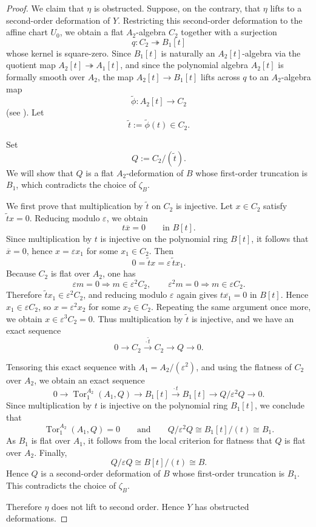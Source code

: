 \documentclass[11pt,twoside]{amsart}
\theoremstyle{plain}
\numberwithin{equation}{section}
\theoremstyle{definition}
\begin{document}
\begin{proof}
We claim that \(\eta\) is obstructed. Suppose, on the contrary, that \(\eta\) lifts to a
second-order deformation of \(Y\). Restricting this second-order deformation to the affine chart
\(U_{0}\), we obtain a flat \(A_{2}\)-algebra \(C_{2}\) together with a surjection
\[
q\colon C_{2}\twoheadrightarrow B_{1}[t]
\]
whose kernel is square-zero. Since \(B_{1}[t]\) is naturally an \(A_{2}[t]\)-algebra via the
quotient map \(A_{2}[t]\twoheadrightarrow A_{1}[t]\), and since the polynomial algebra
\(A_{2}[t]\) is formally smooth over \(A_{2}\), the map \(A_{2}[t]\to B_{1}[t]\) lifts across
\(q\) to an \(A_{2}\)-algebra map
\[
\widetilde{\phi}\colon A_{2}[t]\longrightarrow C_{2}
\]
(see \cite[Tag~00TH]{StacksProject}). Let
\[
\widetilde{t}:=\widetilde{\phi}(t)\in C_{2}.
\]

Set
\[
Q:=C_{2}/(\widetilde{t}).
\]
We will show that \(Q\) is a flat \(A_{2}\)-deformation of \(B\) whose first-order truncation
is \(B_{1}\), which contradicts the choice of \(\zeta_{B}\).

We first prove that multiplication by \(\widetilde{t}\) on \(C_{2}\) is injective. Let
\(x\in C_{2}\) satisfy \(\widetilde{t}x=0\). Reducing modulo \(\varepsilon\), we obtain
\[
t\overline{x}=0 \qquad \text{in } B[t].
\]
Since multiplication by \(t\) is injective on the polynomial ring \(B[t]\), it follows that
\(\overline{x}=0\), hence \(x=\varepsilon x_{1}\) for some \(x_{1}\in C_{2}\). Then
\[
0=\widetilde{t}x=\varepsilon\,\widetilde{t}x_{1}.
\]
Because \(C_{2}\) is flat over \(A_{2}\), one has
\[
\varepsilon m=0 \Longrightarrow m\in \varepsilon^{2}C_{2},
\qquad
\varepsilon^{2}m=0 \Longrightarrow m\in \varepsilon C_{2}.
\]
Therefore \(\widetilde{t}x_{1}\in \varepsilon^{2}C_{2}\), and reducing modulo \(\varepsilon\)
again gives \(t\overline{x_{1}}=0\) in \(B[t]\). Hence \(x_{1}\in \varepsilon C_{2}\), so
\(x=\varepsilon^{2}x_{2}\) for some \(x_{2}\in C_{2}\). Repeating the same argument once more,
we obtain \(x\in \varepsilon^{3}C_{2}=0\). Thus multiplication by \(\widetilde{t}\) is injective,
and we have an exact sequence
\[
0\longrightarrow C_{2}\xrightarrow{\cdot\,\widetilde{t}} C_{2}\longrightarrow Q\longrightarrow 0.
\]

Tensoring this exact sequence with \(A_{1}=A_{2}/(\varepsilon^{2})\), and using the flatness of
\(C_{2}\) over \(A_{2}\), we obtain an exact sequence
\[
0\longrightarrow \operatorname{Tor}^{A_{2}}_{1}(A_{1},Q)
\longrightarrow B_{1}[t]\xrightarrow{\cdot\, t} B_{1}[t]
\longrightarrow Q/\varepsilon^{2}Q
\longrightarrow 0.
\]
Since multiplication by \(t\) is injective on the polynomial ring \(B_{1}[t]\), we conclude that
\[
\operatorname{Tor}^{A_{2}}_{1}(A_{1},Q)=0
\qquad\text{and}\qquad
Q/\varepsilon^{2}Q\cong B_{1}[t]/(t)\cong B_{1}.
\]
As \(B_{1}\) is flat over \(A_{1}\), it follows from the local criterion for flatness
\cite[Tag~051K]{StacksProject} that \(Q\) is flat over \(A_{2}\). Finally,
\[
Q/\varepsilon Q \cong B[t]/(t)\cong B.
\]
Hence \(Q\) is a second-order deformation of \(B\) whose first-order truncation is \(B_{1}\).
This contradicts the choice of \(\zeta_{B}\).

Therefore \(\eta\) does not lift to second order. Hence \(Y\) has obstructed deformations.
\end{proof}
\end{document}
